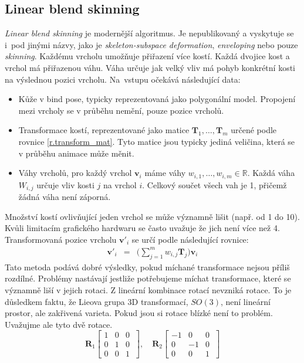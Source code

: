 \subsection{Linear blend skinning} \label{linear_blend_skinning}
\textit{Linear blend skinning} \cite{skinningMethods} je modernější algoritmus. Je nepublikovaný a vyskytuje se i~pod jinými názvy, jako je \textit{skeleton-subspace deformation}, \textit{enveloping} nebo pouze \textit{skinning}. Každému vrcholu umožňuje přiřazení více kostí. Každá dvojice kost a vrchol má přiřazenou váhu. Váha určuje jak velký vliv má pohyb konkrétní kosti na výslednou pozici vrcholu. Na~vstupu očekává následující data: 
\begin{itemize}
\item Kůže v bind pose, typicky reprezentovaná jako polygonální model. Propojení mezi vrcholy se v průběhu nemění, pouze pozice vrcholů. 
\item Transformace kostí, reprezentované jako matice $\mathbf{T}_1,\ldots,\mathbf{T}_m$ určené podle rovnice \ref{r.transform_mat}. Tyto matice jsou typicky jediná veličina, která se v průběhu animace může měnit. 
\item \label{weight_sum} Váhy vrcholů, pro každý vrchol $\mathbf{v}_i$ máme váhy $w_{i,1},\ldots,w_{i,m} \in \mathbb{R}$. Každá váha $W_{i,j}$ určuje vliv kosti $j$ na vrchol $i$. Celkový součet všech vah je 1, přičemž žádná váha není záporná. 
\end{itemize}
Množství kostí ovlivňující jeden vrchol se může významně lišit (např. od 1 do 10). Kvůli limitacím grafického hardwaru se často uvažuje že jich není více než 4. Transformovaná pozice vrcholu $\mathbf{v}'_i$ se určí podle následující rovnice:
\begin{eqnarray}
\mathbf{v}'_i &=& \Bigg(\sum_{j=1}^mw_{i,j} \mathbf{T}_j\Bigg)\mathbf{v}_i\label{r.linear_blend_skinning}
\end{eqnarray}
 Tato metoda podává dobré výsledky, pokud míchané transformace nejsou příliš rozdílné. Problémy nastávají jestliže potřebujeme míchat transformace, které se významně liší v jejich rotaci. Z lineární kombinace rotací nevzniká rotace. To je důsledkem faktu, že Lieova grupa 3D transformací, $SO(3)$, není lineární prostor, ale zakřivená varieta. Pokud jsou si rotace blízké není to problém. Uvažujme ale tyto dvě rotace.
$$\mathbf{R}_1\left[\begin{array}{ccc}
1 & 0 & 0\\
0 & 1 & 0\\
0 & 0 & 1~\end{array}\right], \quad \mathbf{R}_2 \left[\begin{array}{ccc}
-1 & 0 & 0\\
0 & -1 & 0\\
0 & 0 & 1~\end{array}\right]$$ 

